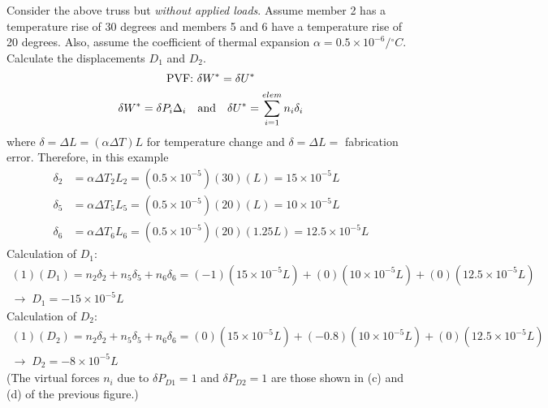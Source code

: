 \begin{example}
Consider the above truss but \emph{without applied loads}. Assume member 2 has a temperature rise of 30 degrees and members 5 and 6 have a temperature rise of 20 degrees. Also, assume the coefficient of thermal expansion $\alpha = 0.5\times10^{-6}/{}^\circ C$. Calculate the displacements $D_1$ and $D_2$.
\begin{gather*}
  \text{PVF: } \delta W^* = \delta U^*\\
  \delta W^* = \delta P_i\Delta_i\quad\text{and}\quad \delta U^* = \sum_{i=1}^{elem}n_i\delta_i
\end{gather*}
where $\delta = \Delta L = (\alpha\Delta T)L$ for temperature change and $\delta = \Delta L =$ fabrication error. Therefore, in this example
\begin{align*}
  \delta_2 &= \alpha\Delta T_2L_2 = (0.5\times10^{-5})(30)(L) = 15\times10^{-5}L\\
  \delta_5 &= \alpha\Delta T_5L_5 = (0.5\times10^{-5})(20)(L) = 10\times10^{-5}L\\
  \delta_6 &= \alpha\Delta T_6L_6 = (0.5\times10^{-5})(20)(1.25L) = 12.5\times10^{-5}L
\end{align*}
Calculation of $D_1$:
\begin{gather*}
  (1)(D_1) = n_2\delta_2 + n_5\delta_5 + n_6\delta_6 = (-1)(15\times10^{-5}L) + (0)(10\times10^{-5}L) + (0)(12.5\times10^{-5}L)\\
  \rightarrow\; D_1 = -15\times10^{-5}L
\end{gather*}
Calculation of $D_2$:
\begin{gather*}
  (1)(D_2) = n_2\delta_2 + n_5\delta_5 + n_6\delta_6 = (0)(15\times10^{-5}L) + (-0.8)(10\times10^{-5}L) + (0)(12.5\times10^{-5}L)\\
  \rightarrow\; D_2 = -8\times10^{-5}L
\end{gather*}
(The virtual forces $n_i$ due to $\delta P_{D1} = 1$ and $\delta P_{D2} = 1$ are those shown in (c) and (d) of the previous figure.)
\end{example}

